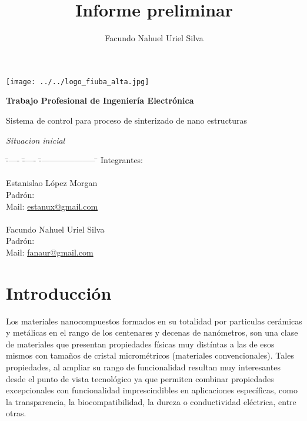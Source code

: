 \documentclass[12pt]{article}
\title{Informe preliminar}
\author{Facundo Nahuel Uriel Silva}
\begin{document}
  \newpage
  \thispagestyle{empty}
  
  \begin{center}
    \texttt{[image: ../../logo\_fiuba\_alta.jpg]} 

  \vspace{100px}

  {\bf \huge{Trabajo Profesional de Ingeniería Electrónica} }
  
  \vspace{30px}

  \Large{Sistema de control para proceso de sinterizado de nano estructuras }
  
  \vspace{30px}
  
  \Large{\textit{Situacion inicial}} %

  \end{center}

  \vspace{100px}

   \begin{bf}
    \begin{Large}
      \begin{tabbing}
	\= ----- \= ----- \= --------------------- \= \kill
	\> Integrantes:\\
	\\
	  \>\> Estanislao López Morgan \\
	  \>\>\>  Padrón:	 \\
	  \>\>\>  Mail:	\>\url{estanux@gmail.com} \\
	\\
	  \>\> Facundo Nahuel Uriel Silva\\
	  \>\>\>  Padrón:	 \\
	  \>\>\>  Mail:	\> \url{fanaur@gmail.com}\\
      \end{tabbing}
    \end{Large}
  \end{bf}



  \newpage
  
  
  \thispagestyle{empty} \tableofcontents \thispagestyle{empty} %

  \newpage
  \setcounter{page}{1}
  
  \section{Introducción}
 Los materiales nanocompuestos formados en su totalidad por particulas cerámicas y metálicas en el rango de los centenares
 y decenas de nanómetros, son una clase de materiales que presentan propiedades físicas muy distíntas a las de esos mismos
 con tamaños de cristal micrométricos (materiales convencionales). Tales propiedades, al ampliar su rango de funcionalidad
 resultan muy interesantes desde el punto de vista tecnológico ya que permiten combinar propiedades excepcionales con funcionalidad
 imprescindibles en aplicaciones específicas, como la transparencia, la biocompatibilidad, la dureza o conductividad eléctrica, entre otras.
\end{document}
